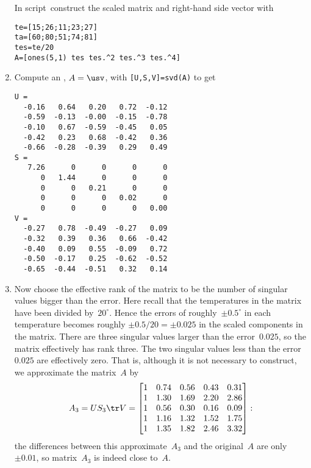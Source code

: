 \begin{example}
\begin{solution}
\begin{enumerate}
In script\ construct the scaled matrix and right-hand side vector with 
\begin{verbatim}
te=[15;26;11;23;27]
ta=[60;80;51;74;81]
tes=te/20
A=[ones(5,1) tes tes.^2 tes.^3 tes.^4]
\end{verbatim}
\setbox\ajrqrbox\hbox{}%
\marginpar{\usebox{\ajrqrbox\\[2ex]}}%

\item Compute an \svd, \(A=\usv\), with \verb|[U,S,V]=svd(A)| to get \twodp
\begin{verbatim}
U =
  -0.16   0.64   0.20   0.72  -0.12
  -0.59  -0.13  -0.00  -0.15  -0.78
  -0.10   0.67  -0.59  -0.45   0.05
  -0.42   0.23   0.68  -0.42   0.36
  -0.66  -0.28  -0.39   0.29   0.49
S =
   7.26      0      0      0      0
      0   1.44      0      0      0
      0      0   0.21      0      0
      0      0      0   0.02      0
      0      0      0      0   0.00
V =
  -0.27   0.78  -0.49  -0.27   0.09
  -0.32   0.39   0.36   0.66  -0.42
  -0.40   0.09   0.55  -0.09   0.72
  -0.50  -0.17   0.25  -0.62  -0.52
  -0.65  -0.44  -0.51   0.32   0.14
\end{verbatim}

\item Now choose the effective rank of the matrix to be the number of singular values bigger than the error.
Here recall that the temperatures in the matrix have been divided by~\(20^\circ\).
Hence the errors of roughly~\(\pm0.5^\circ\) in each temperature becomes roughly \(\pm0.5/20=\pm0.025\) in the scaled components in the matrix.
There are three singular values larger than the error~\(0.025\), so the matrix effectively has rank three.
The two singular values less than the error~\(0.025\) are effectively zero.
That is, although it is not necessary to construct, we approximate the matrix~\(A\) by \twodp
\begin{equation*}
A_3=US_3\tr V=\begin{bmatrix} 1&0.74&0.56&0.43&0.31
\\1&1.30&1.69&2.20&2.86
\\1&0.56&0.30&0.16&0.09
\\1&1.16&1.32&1.52&1.75
\\1&1.35&1.82&2.46&3.32 \end{bmatrix}:
\end{equation*}
the differences between this approximate~\(A_3\) and the original~\(A\) are only~\(\pm0.01\), so matrix~\(A_3\) is indeed close to~\(A\).


\end{enumerate}
\end{solution}
\end{example}
